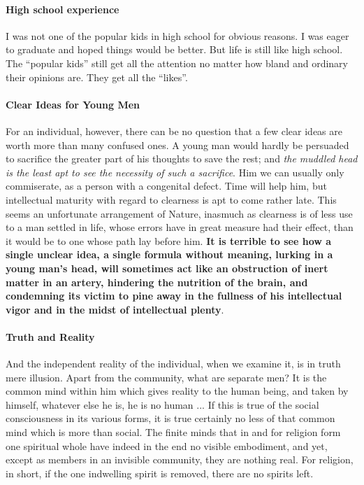 \paragraph{High school experience}


I was not one of the popular kids in high school for obvious reasons. I was eager to graduate and hoped things would be better. But life is still like high school. The ``popular kids'' still get all the attention no matter how bland and ordinary their opinions are. They get all the ``likes''.

\paragraph{Clear Ideas for Young Men}


\begin{quotex}
For an individual, however, there can be no question that a few clear ideas are worth more than many confused ones. A young man would hardly be persuaded to sacrifice the greater part of his thoughts to save the rest; and \emph{the muddled head is the least apt to see the necessity of such a sacrifice}. Him we can usually only commiserate, as a person with a congenital defect. Time will help him, but intellectual maturity with regard to clearness is apt to come rather late. This seems an unfortunate arrangement of Nature, inasmuch as clearness is of less use to a man settled in life, whose errors have in great measure had their effect, than it would be to one whose path lay before him. \textbf{It is terrible to see how a single unclear idea, a single formula without meaning, lurking in a young man's head, will sometimes act like an obstruction of inert matter in an artery, hindering the nutrition of the brain, and condemning its victim to pine away in the fullness of his intellectual vigor and in the midst of intellectual plenty}.
\end{quotex}


\paragraph{Truth and Reality}


\begin{quotex}
And the independent reality of the individual, when we examine it, is in truth mere illusion. Apart from the community, what are separate men? It is the common mind within him which gives reality to the human being, and taken by himself, whatever else he is, he is no human ... If this is true of the social consciousness in its various forms, it is true certainly no less of that common mind which is more than social. The finite minds that in and for religion form one spiritual whole have indeed in the end no visible embodiment, and yet, except as members in an invisible community, they are nothing real. For religion, in short, if the one indwelling spirit is removed, there are no spirits left.
\end{quotex}


